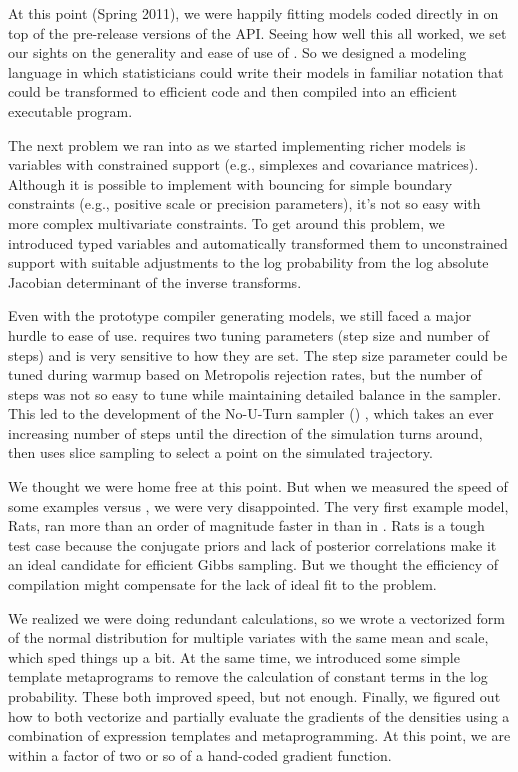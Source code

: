 At this point (Spring 2011), we were happily fitting models coded 
directly in \Cpp on top of the pre-release versions of the \Stan API. 
Seeing how well this all worked, we set our sights on the generality 
and ease of use of \BUGS.  So we designed a modeling language in which 
statisticians could write their models in familiar notation that could 
be transformed to efficient \Cpp code and then compiled into an 
efficient executable program.
 
The next problem we ran into as we started implementing richer models
is variables with constrained support (e.g., simplexes and covariance
matrices).  Although it is possible to implement \HMC with bouncing
for simple boundary constraints (e.g., positive scale or precision
parameters), it's not so easy with more complex multivariate
constraints.  To get around this problem, we introduced typed
variables and automatically transformed them to unconstrained support
with suitable adjustments to the log probability from the log absolute
Jacobian determinant of the inverse transforms.

Even with the prototype compiler generating models, we still faced a
major hurdle to ease of use.  \HMC requires two tuning parameters
(step size and number of steps) and is very sensitive to how they are
set.  The step size parameter could be tuned during warmup based on
Metropolis rejection rates, but the number of steps was not so easy to
tune while maintaining detailed balance in the sampler.  This led to
the development of the No-U-Turn sampler (\NUTS)
\citep{Hoffman-Gelman:2011, Hoffman-Gelman:2014}, which takes an ever
increasing number of steps until the direction of the simulation turns
around, then uses slice sampling to select a point on the simulated
trajectory.

We thought we were home free at this point.  But when we measured the
speed of some \BUGS examples versus \Stan, we were very disappointed.
The very first example model, Rats, ran more than an order of
magnitude faster in \JAGS than in \Stan.  Rats is a tough test case
because the conjugate priors and lack of posterior correlations make
it an ideal candidate for efficient Gibbs sampling.  But we thought
the efficiency of compilation might compensate for the lack of ideal
fit to the problem.  

We realized we were doing redundant calculations, so we wrote a
vectorized form of the normal distribution for multiple variates with
the same mean and scale, which sped things up a bit. At the same
time, we introduced some simple template metaprograms to remove the
calculation of constant terms in the log probability.  These both
improved speed, but not enough.  Finally, we figured out how to both
vectorize and partially evaluate the gradients of the densities using
a combination of expression templates and metaprogramming.  At this
point, we are within a factor of two or so of a hand-coded gradient
function.

